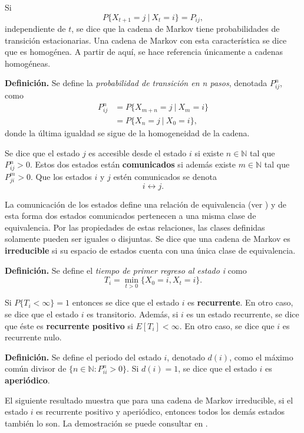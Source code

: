 \documentclass[11pt,a4paper]{article}
\begin{document}
Si $$P\lbrace X_{t+1} = j \ | \ X_t = i\rbrace = P_{ij},$$ independiente de $t$, se dice que la cadena de Markov tiene probabilidades de transición estacionarias. Una cadena de Markov con esta característica se dice que es homogénea. A partir de aquí, se hace referencia únicamente a cadenas homogéneas.

\textbf{Definición.} Se define la \textit{probabilidad de transición en n pasos}, denotada $P_{ij}^n$, como
\begin{align*}
P_{ij}^n &= P\lbrace X_{m+n} = j \ | \ X_{m} = i\rbrace\\
&= P\lbrace X_n = j \ | \ X_0 = i \rbrace,
\end{align*}
donde la última igualdad se sigue de la homogeneidad de la cadena.

Se dice que el estado $j$ es accesible desde el estado $i$ si existe $n \in \mathbb{N}$ tal que $P_{ij}^n > 0$. Estos dos estados están \textbf{comunicados} si además existe $m \in \mathbb{N}$ tal que $P_{ji}^m > 0$. Que los estados $i$ y $j$ estén comunicados se denota
\begin{equation} \label{clase_eq}
i \leftrightarrow j.
\end{equation}

La comunicación de los estados define una relación de equivalencia (ver \citet{ross}) y de esta forma dos estados comunicados pertenecen a una misma clase de equivalencia. Por las propiedades de estas relaciones, las clases definidas solamente pueden ser iguales o disjuntas. Se dice que una cadena de Markov es \textbf{irreducible} si su espacio de estados cuenta con una única clase de equivalencia.

\textbf{Definición.} Se define el \textit{tiempo de primer regreso al estado i} como $$T_i = \min_{t>0} \lbrace X_0 = i, X_t = i \rbrace.$$

Si $P\lbrace T_i < \infty \rbrace = 1 $ entonces se dice que el estado $i$ es \textbf{recurrente}. En otro caso, se dice que el estado $i$ es transitorio. Además, si $i$ es un estado recurrente, se dice que éste es \textbf{recurrente positivo} si $E\left[T_i\right] < \infty$. En otro caso, se dice que $i$ es recurrente nulo.

\textbf{Definición.} Se define el periodo del estado $i$, denotado $d(i)$, como el máximo común divisor de $\lbrace n\in \mathbb{N}: P_{ii}^n > 0\rbrace.$ Si $d(i)=1$, se dice que el estado $i$ es \textbf{aperiódico}.

El siguiente resultado muestra que para una cadena de Markov irreducible, si el estado $i$ es recurrente positivo y aperiódico, entonces todos los demás estados también lo son. La demostración se puede consultar en \citet{ross}.
\end{document}
